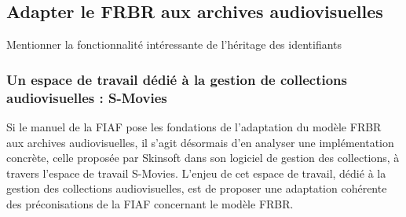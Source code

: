 \subsection{Adapter le FRBR aux archives audiovisuelles}

Mentionner la fonctionnalité intéressante de l'héritage des identifiants

\subsubsection{Un espace de travail dédié à la gestion de collections audiovisuelles : S-Movies}

Si le manuel de la FIAF pose les fondations de l'adaptation du modèle FRBR aux archives audiovisuelles, il s'agit désormais d'en analyser une implémentation concrète, celle proposée par Skinsoft dans son logiciel de gestion des collections, à travers l'espace de travail S-Movies.  L'enjeu de cet espace de travail, dédié à la gestion des collections audiovisuelles, est de proposer une adaptation cohérente des préconisations de la FIAF concernant le modèle FRBR. 

